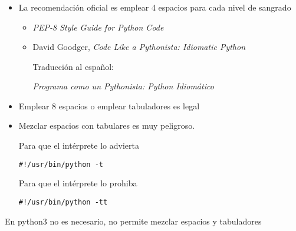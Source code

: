 \documentclass[ucs]{beamer}
\begin{document}


\begin{frame}[fragile]
\frametitle{}
\begin{itemize}
\item
La recomendación oficial es emplear 4 espacios para cada nivel de sangrado
 \begin{itemize}
 \item
 \emph{PEP-8  Style Guide for Python Code}
 \item
 David Goodger, \emph{Code Like a Pythonista: Idiomatic Python}

 Traducción al español:

\emph{Programa como un Pythonista: Python Idiomático}
 \end{itemize}
\item
Emplear 8 espacios o emplear tabuladores es legal
\item
Mezclar espacios con tabulares es muy peligroso. 

Para que el intérprete lo advierta
  \begin{scriptsize}
  \begin{verbatim}
#!/usr/bin/python -t
  \end{verbatim}
  \end{scriptsize}

Para que el intérprete lo prohiba
  \begin{scriptsize}
  \begin{verbatim}
#!/usr/bin/python -tt 
  \end{verbatim}
  \end{scriptsize}
\end{itemize}

En python3 no es necesario, no permite mezclar espacios
y tabuladores 

\end{frame}



%
%
\end{document}
